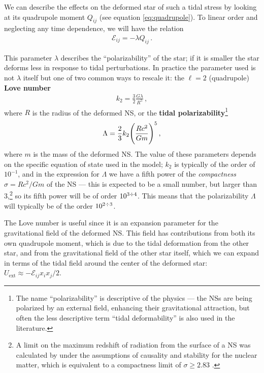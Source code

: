 \documentclass[main.tex]{subfiles}
\begin{document}
We can describe the effects on the deformed star of such a tidal stress by looking at its quadrupole moment \(Q_{ij}\) (see equation \eqref{eq:quadrupole}).
To linear order and neglecting any time dependence, we will have the relation 
%
\begin{align}
\mathcal{E}_{ij} = - \lambda Q_{ij}
\,.
\end{align}


This parameter \(\lambda \) describes the ``polarizability'' of the star; if it is smaller the star deforms less in response to tidal perturbations. 
In practice the parameter used is not \(\lambda \) itself but one of two common ways to rescale it: the \(\ell=2\) (quadrupole) \textbf{Love number} 
%
\begin{align}
k_2 = \frac{3}{2} \frac{G \lambda }{R^{5}}
\,,
\end{align}
%
where \(R\) is the radius of the deformed \ac{NS}, or the \textbf{tidal polarizability}\footnote{The name ``polarizability'' is descriptive of the physics --- the \acp{NS} are being polarized by an external field, enhancing their gravitational attraction, but often the less descriptive term ``tidal deformability'' is also used in the literature.}
\cite[]{damourMeasurabilityTidalPolarizability2012}
%
\begin{align}
\Lambda = \frac{2}{3} k_2 \qty(\frac{Rc^2}{Gm})^{5} 
\,,
\end{align}
%
where \(m\) is the mass of the deformed \ac{NS}. 
The value of these parameters depends on the specific equation of state used in the model; \(k_2\) is typically of the order of \(10^{-1}\), and in the expression for \(\Lambda \) we have a fifth power of the \emph{compactness} \(\sigma = R c^2 / Gm\) of the \ac{NS} --- this is expected to be a small number, but larger than 3,\footnote{A limit on the maximum redshift of radiation from the surface of a \ac{NS} was calculated by \textcite{lindblomLimitsGravitationalRedshift1984} under the assumptions of causality and stability for the nuclear matter, which is equivalent to a compactness limit of \(\sigma \geq 2.83\) \cite{lattimerNeutronStarObservations2007}. } so its fifth power will be of order \(10^{3 \divisionsymbol 4}\). This means that the polarizability \(\Lambda \) will typically be of the order \(10^{2 \divisionsymbol 3}\). 

The Love number is useful since it is an expansion parameter for the gravitational field of the deformed \ac{NS}. This field has contributions from both its own quadrupole moment, which is due to the tidal deformation from the other star, and from the gravitational field of the other star itself, which we can expand in terms of the tidal field around the center of the deformed star: \(U _{\text{ext}} \approx - \mathcal{E}_{ij} x_{i} x_{j} / 2\). 
\end{document}
